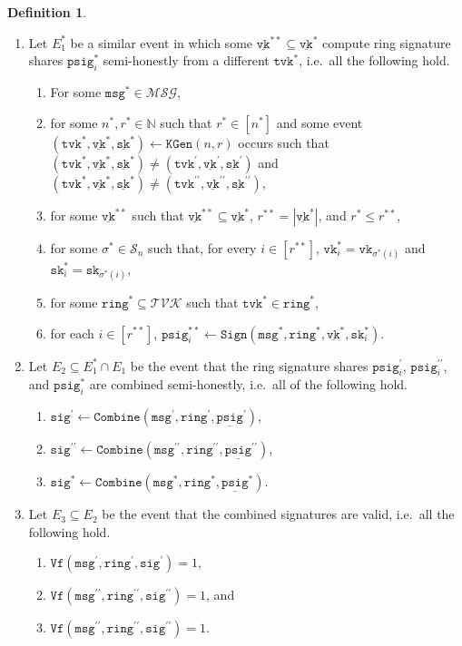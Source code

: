 \documentclass[11pt]{article}
\theoremstyle{definition}
\newtheorem{definition}[definition]{Definition}
\newcommand{\sk}{\texttt{sk}}
\newcommand{\vk}{\texttt{vk}}
\newcommand{\tvk}{\texttt{tvk}}
\newcommand{\ring}{\texttt{ring}}
\newcommand{\SK}{\underline{\texttt{sk}}}
\newcommand{\VK}{\underline{\texttt{vk}}}
\newcommand{\sig}{\texttt{sig}}
\newcommand{\psig}{\texttt{psig}}
\newcommand{\psigs}{\underline{\texttt{psig}}}
\newcommand{\bbn}{\mathbb{N}}
\newcommand{\msg}{\texttt{msg}}
\newcommand{\keygen}{\texttt{KGen}}
\newcommand{\keygenIshort}{(n,r)}
\newcommand{\sign}{\texttt{Sign}}
\newcommand{\combine}{\texttt{Combine}}
\newcommand{\verify}{\texttt{Vf}}
\begin{document}
\begin{definition}
\begin{enumerate}
\item Let $E_1^*$ be a similar event in which some $\VK^{**} \subseteq \VK^*$ compute ring signature shares $\psig^*_i$ semi-honestly from a different $\tvk^*$, i.e.\ all the following hold.
\begin{enumerate}
\item For some $\msg^* \in \mathcal{MSG}$,
\item for some $n^*, r^* \in \bbn$ such that  $r^* \in [n^*]$ and some event $(\tvk^*, \VK^*,  \SK^*) \leftarrow \keygen\keygenIshort$ occurs such that $(\tvk^*, \VK^*,  \SK^*) \neq (\tvk^\prime, \VK^\prime,  \SK^\prime)$ and $(\tvk^*, \VK^*,  \SK^*) \neq (\tvk^{\prime\prime}, \VK^{\prime\prime},  \SK^{\prime\prime})$,
\item for some $\VK^{**}$
such that $\VK^{**} \subseteq \VK^*$, $r^{**} = \left|\VK^*\right|$, and  $r^* \leq r^{**}$,
\item for some $\sigma^* \in \mathcal{S}_n$ such that, for every $i \in [r^{**}]$, $\vk^*_i = \vk_{\sigma^*(i)}$ and  $\sk^*_i = \sk_{\sigma^*(i)}$,
\item for some $\ring^* \subseteq \mathcal{TVK}$ such that $\tvk^* \in \ring^*$,

\item for each $i \in [r^{**}]$, $\psig_i^{**} \leftarrow \sign(\msg^*, \ring^*, \VK^*,  \sk^*_i)$.
\end{enumerate}




\item Let $E_2 \subseteq E_1^* \cap E_1$ be the event that the ring signature shares $\psig_i^\prime$, $\psig_i^{\prime \prime}$, and $\psig_i^{*}$ are combined semi-honestly, i.e.\ all of the following hold.
\begin{enumerate}
\item $\sig^\prime \leftarrow \combine(\msg^\prime, \ring^\prime, \psigs^\prime)$,
\item $\sig^{\prime\prime} \leftarrow \combine(\msg^{\prime\prime}, \ring^{\prime\prime},  \psigs^{\prime\prime})$,
\item $\sig^* \leftarrow \combine(\msg^*, \ring^*, \psigs^*)$.
\end{enumerate}

\item  Let $E_3 \subseteq E_2$ be the event that the combined signatures are valid, i.e.\ all the following hold.
\begin{enumerate}
\item $\verify(\msg^{\prime}, \ring^{\prime}, \sig^\prime) = 1$,
\item $\verify(\msg^{\prime\prime}, \ring^{\prime\prime}, \sig^{\prime\prime}) = 1$, and
\item $\verify(\msg^{\prime\prime}, \ring^{\prime\prime}, \sig^{\prime\prime}) = 1$.
\end{enumerate}


\end{enumerate}
\end{definition}
\end{document}

